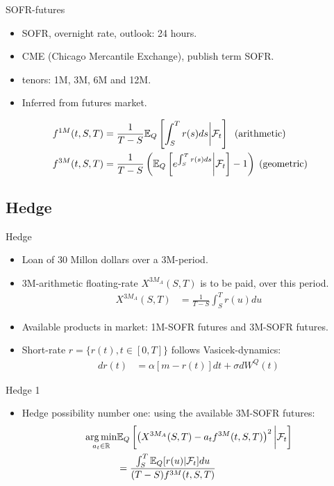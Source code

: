 \documentclass[UKenglish]{beamer}
\newcommand{\E}{\mathbb{E}}  %
\newcommand{\F}{\mathcal{F}} %
\newcommand{\R}{\mathbb{R}}  %
\begin{document}
\begin{frame}{SOFR-futures}
\begin{itemize}
    \item SOFR, overnight rate, outlook: 24 hours. 
    \item CME (Chicago Mercantile Exchange), publish term SOFR. 
    \item tenors: 1M, 3M, 6M and 12M. 
    \item Inferred from futures market. 
\end{itemize}


\begin{definition}
\begin{align*}
f^{1M}(t,S,T) &= \frac{1}{T-S}\E_{Q}\left[
\int_{S}^{T}r(s)ds\bigg{|}\F_{t}
\right]\;\;(\text{arithmetic}) \\ 
f^{3M}(t,S,T) &= \frac{1}{T-S}\left(
\E_{Q}\left[
e^{\int_{S}^{T}r(s)ds}\bigg{|}\F_{t}
\right] - 1
\right)\;(\text{geometric})
\end{align*}    
\end{definition}
\end{frame}

\subsection{Hedge}

\begin{frame}{Hedge}
\begin{itemize}
    \item Loan of 30 Millon dollars over a 3M-period. 
    \item 3M-arithmetic floating-rate $X^{3M_{A}}(S,T)$ is to be paid, over this period. 
    \begin{align*}
    X^{3M_{A}}(S,T) &= \frac{1}{T-S}\int_{S}^{T}r(u)du
    \end{align*}
    \item Available products in market: 1M-SOFR futures and 3M-SOFR futures. 
    \item Short-rate $r = \{r(t), t\in [0,T]\}$ follows Vasicek-dynamics: 
    \begin{align*}
     dr(t) &= \alpha[m-r(t)]dt + \sigma dW^{Q}(t)   
    \end{align*}
\end{itemize}
\end{frame} 


\begin{frame}{Hedge 1}
\begin{itemize}
    \item Hedge possibility number one: using the available 3M-SOFR futures: 
\begin{align*}
\underset{a_{t}\in \R}{\arg\min}
&\E_{Q}\left[
\left(
X^{3M_{A}}(S,T)-a_{t}f^{3M}(t,S,T)
\right)^{2}
\bigg{|}\F_{t}
\right] \\ 
&= \frac{
\int_{S}^{T}\E_{Q}[r(u)|\F_{t}]du
}{
(T-S)f^{3M}(t,S,T)
}      
\end{align*}

\end{itemize}
\end{frame}
\end{document}
